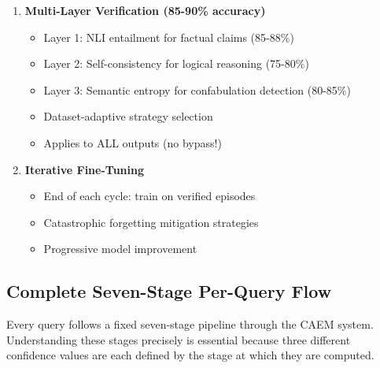 \documentclass[12pt,a4paper]{article}
\theoremstyle{definition}
\newcommand{\caem}{\textsc{CAEM}}
\begin{document}
\begin{enumerate}
    \item \textbf{Multi-Layer Verification (85-90\% accuracy)}
    \begin{itemize}
        \item Layer 1: NLI entailment for factual claims (85-88\%)
        \item Layer 2: Self-consistency for logical reasoning (75-80\%)
        \item Layer 3: Semantic entropy for confabulation detection (80-85\%)
        \item Dataset-adaptive strategy selection
        \item Applies to ALL outputs (no bypass!)
    \end{itemize}
    
    \item \textbf{Iterative Fine-Tuning}
    \begin{itemize}
        \item End of each cycle: train on verified episodes
        \item Catastrophic forgetting mitigation strategies
        \item Progressive model improvement
    \end{itemize}
\end{enumerate}

\subsection{Complete Seven-Stage Per-Query Flow}

Every query follows a fixed seven-stage pipeline through the \caem{} system. Understanding these stages precisely is essential because three different confidence values are each defined by the stage at which they are computed.
\end{document}
